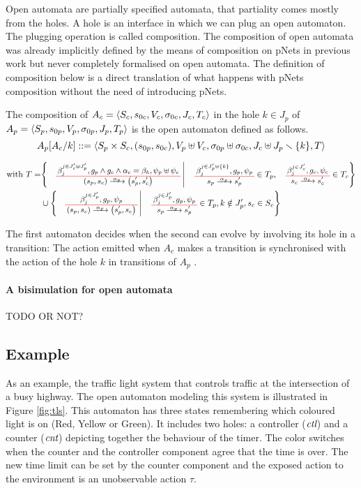 \documentclass[runningheads]{llncs}
\newcommand{\symb}[1]{\makebox{\it #1}}
\begin{document}
Open automata are partially specified automata, that partiality comes mostly from the holes.
A hole is an interface in which we can plug an open automaton.
The plugging operation is called composition.
The composition of open automata was already implicitly defined by the means of composition on pNets in previous work \cite{henrio:01299562} but never completely formalised on open automata.
The definition of composition below is a direct translation of what happens with pNets composition without the need of introducing pNets.
\begin{definition}
The composition of \(A_c = \OAg[c]\) in the hole \(k \in J_p\) of \(A_p = \OAg[p]\) is the open automaton defined as follows.
\[
	A_p\subst{A_c}{k} ::=  \OA{S_p \times S_c}{\mpar{s_{0p}, s_{0c}}}{V_p \uplus V_c}{\sigma_{0p} \uplus \sigma_{0c}}{J_c \uplus J_p \setminus \mbrc{k}}{T} \]

\begin{align*}
	\text{with } T = & \mset{\OT{\mpar{s_p, s_c}}{\mpar{s'_p, s'_c}}{\alpha_p}{\beta_j^{j \in J'_c \uplus J'_p}}{g_p \wedge g_c \wedge \alpha_c = \beta_k}{\psi_p \uplus \psi_c}}{ \OT{s_p}{s'_p}{\alpha_p}{\beta_j^{j \in J'_p \uplus \mbrc{k} }}{g_p}{\psi_p} \in T_p, \OTx{c}{}{}{c} \in T_c} \\
	& \cup \mset{\OT{\mpar{s_p, s_c}}{\mpar{s'_p, s_c}}{\alpha_p}{\beta_j^{j \in J'_p}}{g_p}{\psi_p}}{\OTx{p}{}{}{p} \in T_p, k \notin J'_p, s_c \in S_c}
\end{align*}
\end{definition}
The first automaton decides when the second can evolve by involving its hole in a transition:
The action emitted when \(A_c\) makes a transition is synchronised with the action of the hole \(k\) in transitions of \(A_p\) .


\paragraph{A bisimulation for open automata}

TODO OR NOT?

\subsection{Example}

As an example, the traffic light system  that controls  
 traffic at the intersection of a busy highway. The open automaton  
modeling this system  is illustrated in  Figure \ref{fig:tls}. This automaton has three states  remembering which coloured light
is on (Red, Yellow or Green). It includes two holes: a controller ($\symb{ctl}$) and a counter ($\symb{cnt}$)  depicting together the behaviour of the timer. The color switches when the counter and the controller component agree that the time is over. The new time limit can be set by the counter component and the exposed action to the environment is an unobservable  action $\tau$.
\end{document}
